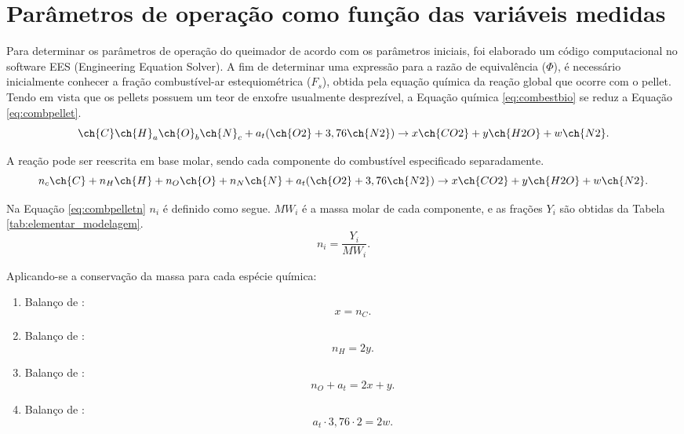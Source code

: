 \section{Parâmetros de operação como função das variáveis medidas}
Para determinar os parâmetros de operação do queimador de acordo com os parâmetros iniciais, foi elaborado um código computacional no software EES (Engineering Equation Solver). A fim de determinar uma expressão para a razão de equivalência ($\Phi$), é necessário inicialmente conhecer a fração combustível-ar estequiométrica ($F_s$), obtida pela equação química da reação global que ocorre com o pellet. Tendo em vista que os pellets possuem um teor de enxofre usualmente desprezível, a Equação química \eqref{eq:combestbio} se reduz a Equação \eqref{eq:combpellet}.
\begin{equation} \label{eq:combpellet}
\ch{C} \ch{H}_a \ch{O}_b \ch{N}_c + a_t(\ch{O2} + 3,76 \ch{N2}) \rightarrow{} x \ch{CO2} + y \ch{H2O} + w \ch{N2}.
\end{equation}

\noindent A reação pode ser reescrita em base molar, sendo cada componente do combustível especificado separadamente. 
\begin{equation} \label{eq:combpelletn}
n_c \ch{C} + n_H \ch{H} + n_O \ch{O} + n_N \ch{N} + a_t(\ch{O2} + 3,76 \ch{N2}) \rightarrow{} x \ch{CO2} + y \ch{H2O} + w \ch{N2}.
\end{equation}

\noindent Na Equação \eqref{eq:combpelletn} $n_i$ é definido como segue. $MW_i$ é a massa molar de cada componente, e as frações $Y_i$ são obtidas da Tabela \ref{tab:elementar_modelagem}.
\begin{equation} \label{eq:enee}
n_i = \frac{Y_i}{MW_i}.
\end{equation}

Aplicando-se a conservação da massa para cada espécie química:
\begin{enumerate}[noitemsep,nosep,labelindent=\parindent,leftmargin=*,label={\alph*}) ] 
	\item Balanço de :
	\begin{equation}
	    x = n_C.    
	\end{equation}
	\item Balanço de :
	\begin{equation}
	    n_H = 2y.    
	\end{equation}
    \item Balanço de :
	\begin{equation}
	    n_O + a_t = 2x + y.    
	\end{equation}
    \item Balanço de :
	\begin{equation}
	    a_t\cdot3,76\cdot2 = 2w.    
	\end{equation}
\end{enumerate}

